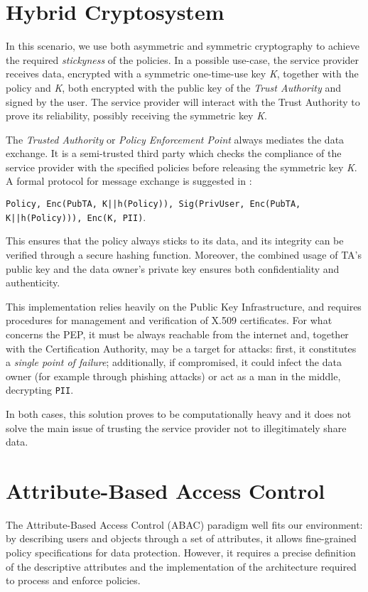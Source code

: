 \section{Hybrid Cryptosystem}
In this scenario, we use both asymmetric and symmetric cryptography to achieve the required \textit{stickyness} of the policies. In a possible use-case, the service provider receives data, encrypted with a symmetric one-time-use key \textit{K}, together with the policy and \textit{K}, both encrypted with the public key of the \textit{Trust Authority} and signed by the user. The service provider will interact with the Trust Authority to prove its reliability, possibly receiving the symmetric key \textit{K}.

The \textit{Trusted Authority} or \textit{Policy Enforcement Point} always mediates the data exchange. It is a semi-trusted third party which checks the compliance of the service provider with the specified policies before releasing the symmetric key \textit{K}. A formal protocol for message exchange is suggested in \cite{pearson2011sticky}: 

\begin{sloppypar}
\centering
\texttt{Policy, Enc(PubTA, K||h(Policy)), Sig(PrivUser, Enc(PubTA, K||h(Policy))), Enc(K, PII)}.
\end{sloppypar}

This ensures that the policy always sticks to its data, and its integrity can be verified through a secure hashing function. Moreover, the combined usage of TA's public key and the data owner's private key ensures both confidentiality and authenticity. 

This implementation relies heavily on the Public Key Infrastructure, and requires procedures for management and verification of X.509 certificates. For what concerns the PEP, it must be always reachable from the internet and, together with the Certification Authority, may be a target for attacks: first, it constitutes a \textit{single point of failure}; additionally, if compromised, it could infect the data owner (for example through phishing attacks) or act as a man in the middle, decrypting \texttt{PII}.

In both cases, this solution proves to be computationally heavy and it does not solve the main issue of trusting the service provider not to illegitimately share data.

\section{Attribute-Based Access Control}
The Attribute-Based Access Control (ABAC) paradigm well fits our environment: by describing users and objects through a set of attributes, it allows fine-grained policy specifications for data protection. However, it requires a precise definition of the descriptive attributes and the implementation of the architecture required to process and enforce policies.

